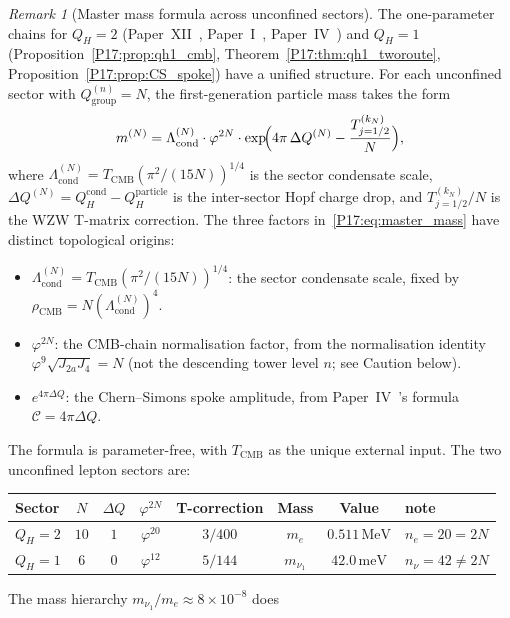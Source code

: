 \documentclass[11pt,a4paper]{article}
\theoremstyle{definition}\newtheorem{definition}[theorem]{Definition}
\theoremstyle{remark}
\newtheorem{remark}[theorem]{Remark}
\newcommand{\vp}{\varphi}
\newcommand{\Ja}{J_{2a}}
\newcommand{\Jfour}{J_4}
\newcommand{\TCMB}{T_{\mathrm{CMB}}}
\newcommand{\Lcond}{\Lambda_{\mathrm{cond}}}
\newcommand{\rCMB}{\rho_{\mathrm{CMB}}}
\newcommand{\QH}{Q_H}
\begin{document}
\begin{remark}[Master mass formula across unconfined sectors]
\label{P17:rem:master_formula}
The one-parameter chains for $\QH=2$ (Paper~XII~\cite{Paper12}, Paper~I~\cite{Paper1}, Paper~IV~\cite{Paper4})
and $\QH=1$ (Proposition~\ref{P17:prop:qh1_cmb},
Theorem~\ref{P17:thm:qh1_tworoute}, Proposition~\ref{P17:prop:CS_spoke})
have a unified structure.  For each unconfined sector with
$Q_{\mathrm{group}}^{(n)}=N$, the first-generation particle mass takes the form
\begin{equation}
  m^{(N)}
  = \Lcond^{(N)}\cdot\vp^{2N}
    \cdot\exp\!\Bigl(4\pi\,\Delta Q^{(N)}-\frac{T_{j=1/2}^{(k_N)}}{N}\Bigr),
  \label{P17:eq:master_mass}
\end{equation}
where $\Lcond^{(N)}=\TCMB(\pi^2/(15N))^{1/4}$ is the sector condensate scale,
$\Delta Q^{(N)}=Q_H^{\mathrm{cond}}-Q_H^{\mathrm{particle}}$ is the inter-sector
Hopf charge drop, and $T_{j=1/2}^{(k_N)}/N$ is the WZW T-matrix correction.
The three factors in~\eqref{P17:eq:master_mass} have distinct topological origins:
\begin{itemize}[noitemsep]
\item $\Lcond^{(N)}=\TCMB(\pi^2/(15N))^{1/4}$:
  the sector condensate scale, fixed by $\rCMB=N(\Lcond^{(N)})^4$.
\item $\vp^{2N}$: the CMB-chain normalisation factor, from the
  normalisation identity $\vp^9\sqrt{\Ja\Jfour}=N$
  (not the descending tower level $n$; see Caution below).
\item $e^{4\pi\Delta Q}$: the Chern--Simons spoke amplitude,
  from Paper~IV~\cite{Paper4}'s formula $\mathcal{C}=4\pi\Delta Q$.
\end{itemize}
The formula is parameter-free, with $\TCMB$ as the unique external
input.  The two unconfined lepton sectors are:
\begin{center}
\renewcommand{\arraystretch}{1.3}
\begin{tabular}{lccccccl}
\toprule
Sector & $N$ & $\Delta Q$ & $\vp^{2N}$ & T-correction & Mass & Value & note \\
\midrule
$\QH=2$ & $10$ & $1$ & $\vp^{20}$ & $3/400$ & $m_e$ & $0.511\,\mathrm{MeV}$ & $n_e=20=2N$ \\
$\QH=1$ & $6$  & $0$ & $\vp^{12}$ & $5/144$ & $m_{\nu_1}$ & $42.0\,\mathrm{meV}$ & $n_\nu=42\neq2N$ \\
\bottomrule
\end{tabular}
\end{center}
The mass hierarchy $m_{\nu_1}/m_e\approx8\times10^{-8}$ does

\end{remark}
\end{document}
